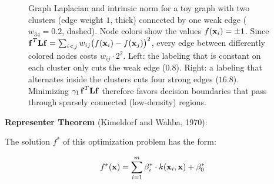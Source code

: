 \begin{figure}[htbp]
    \caption{Graph Laplacian and intrinsic norm for a toy graph with two clusters (edge weight $1$, thick) connected by one weak edge ($w_{34}=0.2$, dashed). Node colors show the values $f(\bm{\mathrm{x}}_i)=\pm1$. Since $\bm{\mathrm{f}}^T\mathbf{L}\bm{\mathrm{f}}=\sum_{i<j}w_{ij}\big(f(\bm{\mathrm{x}}_i)-f(\bm{\mathrm{x}}_j)\big)^2$, every edge between differently colored nodes costs $w_{ij}\cdot 2^2$. Left: the labeling that is constant on each cluster only cuts the weak edge ($0.8$). Right: a labeling that alternates inside the clusters cuts four strong edges ($16.8$). Minimizing $\gamma_\text{I}\,\bm{\mathrm{f}}^T\mathbf{L}\bm{\mathrm{f}}$ therefore favors decision boundaries that pass through sparsely connected (low-density) regions.}
    \label{fig:lapsvm_graph}
  \end{figure}
    \textbf{Representer Theorem} (Kimeldorf and Wahba, 1970):    
  
  The solution $f^*$ of this optimization problem has the form:

  \begin{displaymath}
    f^*(\bm{\mathrm{x}}) = \sum_{i=1}^m \beta_i^* \cdot k(\bm{\mathrm{x}}_i, \bm{\mathrm{x}}) + \beta_0^*
  \end{displaymath}
 
